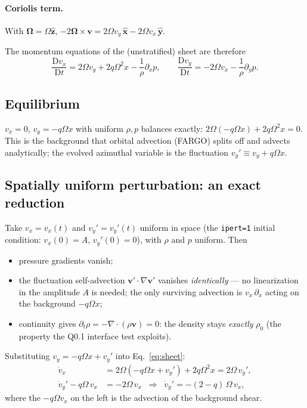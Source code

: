 \documentclass[11pt]{article}
\begin{document}
\paragraph{Coriolis term.} With $\boldsymbol\Omega = \Omega\hat{\mathbf z}$,
$-2\boldsymbol\Omega\times\mathbf v = 2\Omega v_y\,\hat{\mathbf x}
- 2\Omega v_x\,\hat{\mathbf y}$.

\medskip\noindent
The momentum equations of the (unstratified) sheet are therefore
\begin{equation}
\frac{\mathrm{D}v_x}{\mathrm{D}t} = 2\Omega v_y + 2q\Omega^2 x
 - \frac{1}{\rho}\partial_x p,
\qquad
\frac{\mathrm{D}v_y}{\mathrm{D}t} = -2\Omega v_x - \frac{1}{\rho}\partial_y p.
\label{eq:sheet}
\end{equation}

\subsection{Equilibrium}
$v_x = 0$, $v_y = -q\Omega x$ with uniform $\rho, p$ balances exactly:
$2\Omega(-q\Omega x) + 2q\Omega^2x = 0$. This is the background that orbital
advection (FARGO) splits off and advects analytically; the evolved azimuthal
variable is the fluctuation $v_y' \equiv v_y + q\Omega x$.

\subsection{Spatially uniform perturbation: an exact reduction}
Take $v_x = v_x(t)$ and $v_y' = v_y'(t)$ uniform in space (the \texttt{ipert=1}
initial condition: $v_x(0) = A$, $v_y'(0) = 0$), with $\rho$ and $p$ uniform. Then
\begin{itemize}
\item pressure gradients vanish;
\item the fluctuation self-advection $\mathbf v'\!\cdot\!\nabla\mathbf v'$ vanishes
  \emph{identically} --- no linearization in the amplitude $A$ is needed; the only
  surviving advection is $v_x\,\partial_x$ acting on the background $-q\Omega x$;
\item continuity gives $\partial_t\rho = -\nabla\!\cdot(\rho\mathbf v) = 0$: the
  density stays \emph{exactly} $\rho_0$ (the property the Q0.1 interface test
  exploits).
\end{itemize}
Substituting $v_y = -q\Omega x + v_y'$ into Eq.~\eqref{eq:sheet}:
\begin{align}
\dot v_x &= 2\Omega(-q\Omega x + v_y') + 2q\Omega^2 x = 2\Omega\,v_y',
\label{eq:epi_vx}\\
\dot v_y' - q\Omega\,v_x &= -2\Omega\,v_x
\;\;\Longrightarrow\;\;
\dot v_y' = -(2-q)\,\Omega\,v_x ,
\label{eq:epi_vy}
\end{align}
where the $-q\Omega v_x$ on the left is the advection of the background shear.
\end{document}
